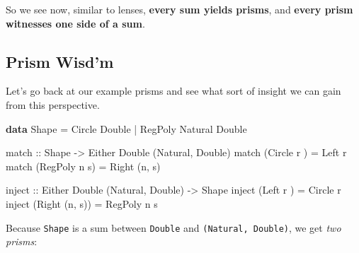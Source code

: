 \documentclass[]{article}
\newenvironment{Shaded}{}{}
\newcommand{\DataTypeTok}[1]{\textcolor[rgb]{0.56,0.13,0.00}{#1}}
\newcommand{\FunctionTok}[1]{\textcolor[rgb]{0.02,0.16,0.49}{#1}}
\newcommand{\KeywordTok}[1]{\textcolor[rgb]{0.00,0.44,0.13}{\textbf{#1}}}
\newcommand{\NormalTok}[1]{#1}
\newcommand{\OtherTok}[1]{\textcolor[rgb]{0.00,0.44,0.13}{#1}}
\begin{document}
So we see now, similar to lenses, \textbf{every sum yields prisms}, and
\textbf{every prism witnesses one side of a sum}.

\hypertarget{prism-wisdm}{%
\subsection{Prism Wisd'm}\label{prism-wisdm}}

Let's go back at our example prisms and see what sort of insight we can gain
from this perspective.

\begin{Shaded}
\begin{Highlighting}[]
\KeywordTok{data} \DataTypeTok{Shape} \FunctionTok{=} \DataTypeTok{Circle}  \DataTypeTok{Double}
           \FunctionTok{|} \DataTypeTok{RegPoly} \DataTypeTok{Natural} \DataTypeTok{Double}

\OtherTok{match ::} \DataTypeTok{Shape} \OtherTok{->} \DataTypeTok{Either} \DataTypeTok{Double}\NormalTok{ (}\DataTypeTok{Natural}\NormalTok{, }\DataTypeTok{Double}\NormalTok{)}
\NormalTok{match (}\DataTypeTok{Circle}\NormalTok{  r  ) }\FunctionTok{=} \DataTypeTok{Left}\NormalTok{ r}
\NormalTok{match (}\DataTypeTok{RegPoly}\NormalTok{ n s) }\FunctionTok{=} \DataTypeTok{Right}\NormalTok{ (n, s)}

\OtherTok{inject ::} \DataTypeTok{Either} \DataTypeTok{Double}\NormalTok{ (}\DataTypeTok{Natural}\NormalTok{, }\DataTypeTok{Double}\NormalTok{) }\OtherTok{->} \DataTypeTok{Shape}
\NormalTok{inject (}\DataTypeTok{Left}\NormalTok{   r    ) }\FunctionTok{=} \DataTypeTok{Circle}\NormalTok{  r}
\NormalTok{inject (}\DataTypeTok{Right}\NormalTok{ (n, s)) }\FunctionTok{=} \DataTypeTok{RegPoly}\NormalTok{ n s}
\end{Highlighting}
\end{Shaded}

Because \texttt{Shape} is a sum between \texttt{Double} and
\texttt{(Natural,\ Double)}, we get \emph{two prisms}:
\end{document}

